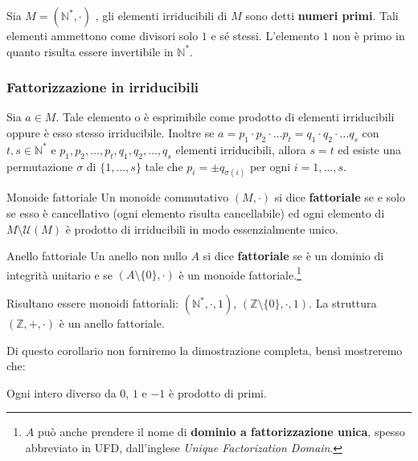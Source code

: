 \begin{osservation}
	Sia $M=(\mathbb{N}^{*},\cdot)$ , gli elementi irriducibili di $M$ sono detti \textbf{numeri primi}. Tali elementi ammettono come divisori solo $1$ e sé stessi. L'elemento $1$ non è primo in quanto risulta essere invertibile in $\mathbb{N}^{*}$.
\end{osservation}

\subsubsection{Fattorizzazione in irriducibili}

\begin{teorbox}
	Sia $a \in M$. Tale elemento o è esprimibile come prodotto di elementi irriducibili oppure è esso stesso irriducibile. Inoltre se $a=p_{1}\cdot p_{2} \cdot \dots p_{t} = q_{1} \cdot q_{2} \cdot \dots q_{s}$ con $t,s \in \mathbb{N}^{*}$ e $p_{1},p_{2}, \ldots, p_{t},q_{1},q_{2},\ldots, q_{s}$ elementi irriducibili, allora $s=t$ ed esiste una permutazione $\sigma$ di $\{1,\ldots,s\}$ tale che $p_{i} = \pm q_{\sigma(i)}$ per ogni $i=1,\ldots,s$.
\end{teorbox}

\begin{defbox}{Monoide fattoriale}
	Un monoide commutativo $(M,\cdot)$ si dice \textbf{fattoriale} se e solo se esso è cancellativo (ogni elemento risulta cancellabile) ed ogni elemento di $M \setminus \mathcal{U}(M)$ è prodotto di irriducibili in modo essenzialmente unico.
\end{defbox}

\begin{defbox}{Anello fattoriale}
	Un anello non nullo $A$ si dice \textbf{fattoriale} se è un dominio di integrità unitario e se $(A\setminus \{0\},\cdot)$ è un monoide fattoriale.\footnote{$A$ può anche prendere il nome di \textbf{dominio a fattorizzazione unica}, spesso abbreviato in UFD, dall'inglese \textit{Unique Factorization Domain}.}
\end{defbox}

\begin{corolbox}
	Risultano essere monoidi fattoriali: $(\mathbb{N}^{*},\cdot, 1)$, $(\mathbb{Z}\setminus\{0\},\cdot,1)$. La struttura $(\mathbb{Z},+,\cdot)$ è un anello fattoriale.
\end{corolbox}

Di questo corollario non forniremo la dimostrazione completa, bensì mostreremo che:
\begin{lemmabox}
	 Ogni intero diverso da $0$, $1$ e $-1$ è prodotto di primi.
\end{lemmabox}

